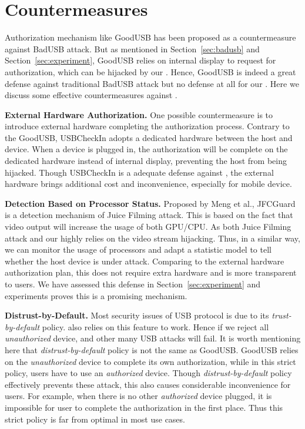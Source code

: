 \section{Countermeasures}

\label{sec:countermeasures}
Authorization mechanism like GoodUSB\cite{tian2015defending} has been proposed as a countermeasure against BadUSB attack. But as mentioned in Section~\ref{sec:badusb} and Section~\ref{sec:experiment}, GoodUSB relies on internal display to request for authorization, which can be hijacked by our \tool. Hence, GoodUSB is indeed a great defense against traditional BadUSB attack but no defense at all for our \tool. Here we discuss some effective countermeasures against \tool.

\textbf{External Hardware Authorization.}
One possible countermeasure is to introduce external hardware completing the authorization process. Contrary to the GoodUSB, USBCheckIn\cite{usbcheckin} adopts a dedicated hardware between the host and device. When a device is plugged in, the authorization will be complete on the dedicated hardware instead of internal display, preventing the host from being hijacked. Though USBCheckIn is a adequate defense against \tool, the external hardware brings additional cost and inconvenience, especially for mobile device.

\textbf{Detection Based on Processor Status.}
Proposed by Meng et al., JFCGuard\cite{MENG2018252} is a detection mechanism of Juice Filming attack. This is based on the fact that video output will increase the usage of both GPU/CPU. As both Juice Filming attack and our \tool  highly relies on the video stream hijacking.  Thus, in a similar way, we can monitor the usage of processors and adapt a statistic model to tell whether the host device is under \tool attack. Comparing to the external hardware authorization plan, this does not require extra hardware and is more transparent to users. We have assessed this defense in Section~\ref{sec:experiment} and experiments proves this is a promising mechanism.

\textbf{Distrust-by-Default.}
Most security issues of USB protocol is due to its \textit{trust-by-default} policy. \tool also relies on this feature to work. Hence if we reject all \textit{unauthorized} device, \tool and other many USB attacks will fail. It is worth mentioning here that \textit{distrust-by-default} policy is not the same as GoodUSB\cite{tian2015defending}. GoodUSB relies on the \textit{unauthorized} device to complete its own authorization, while in this strict policy, users have to use an \textit{authorized} device. Though \textit{distrust-by-default} policy effectively prevents these attack, this also causes considerable inconvenience for users. For example, when there is no other \textit{authorized} device plugged, it is impossible for user to complete the authorization in the first place. Thus this strict policy is far from optimal in most use cases.